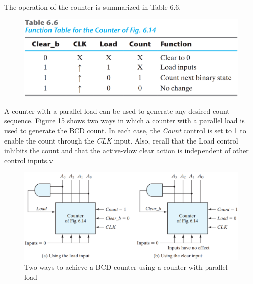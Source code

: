 \begin{multicols}{2}
\setlength{\columnsep}{1.5cm}
\setlength{\columnseprule}{0.2pt}

\noindent The operation of the counter is summarized in Table 6.6.

\begin{figure}[H]
  \centering
  \includegraphics[width=\linewidth]{img/table-6.6.png}
  \label{table:6.6}
\end{figure}

A counter with a parallel load can be used to generate any desired count sequence. Figure 15 shows two ways in which a counter with a parallel load is used to generate the BCD count. In each case, the \textit{Count} control is set to 1 to enable the count through the \textit{CLK} input. Also, recall that the Load control inhibits the count and that the active-vlow clear action is independent of other control inputs.v

\end{multicols}

\begin{figure}[H]
  \centering
  \includegraphics[width=.8\linewidth]{img/fig-6.15.png}
  \caption{Two ways to achieve a BCD counter using a counter with parallel load}
  \label{fig:6.15}
\end{figure}

